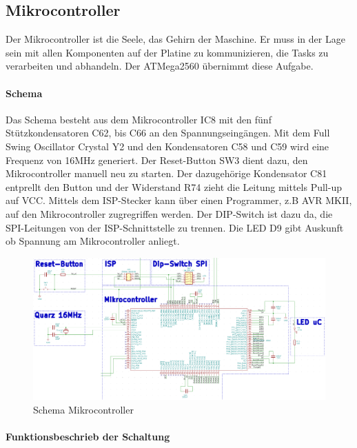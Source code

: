 \subsection{Mikrocontroller}
\label{subsec:Mikrocontroller}

Der Mikrocontroller ist die Seele, das Gehirn der Maschine. Er muss in der Lage sein mit allen Komponenten auf der Platine zu kommunizieren, die Tasks zu verarbeiten und abhandeln. Der ATMega2560 übernimmt diese Aufgabe.

\paragraph{Schema}\mbox{}

Das Schema besteht aus dem Mikrocontroller IC8 mit den fünf Stützkondensatoren C62, bis C66 an den Spannungseingängen. Mit dem Full Swing Oscillator Crystal Y2 und den Kondensatoren C58 und C59 wird eine Frequenz von 16MHz generiert. Der Reset-Button SW3 dient dazu, den Mikrocontroller manuell neu zu starten. Der dazugehörige Kondensator C81 entprellt den Button und der Widerstand R74 zieht die Leitung mittels Pull-up auf VCC. Mittels dem ISP-Stecker kann über einen Programmer, z.B AVR MKII, auf den Mikrocontroller zugregriffen werden. Der DIP-Switch ist dazu da, die SPI-Leitungen von der ISP-Schnittstelle zu trennen. Die LED D9 gibt Auskunft ob Spannung am Mikrocontroller anliegt.

\begin{figure}[!h]
\center
\includegraphics[width = \textwidth]{graphics/Schema_uC}
\caption{Schema Mikrocontroller}
\label{fig:Schema_uC}
\end{figure}

\paragraph{Funktionsbeschrieb der Schaltung}\mbox{}

